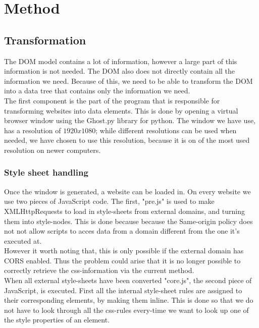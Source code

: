 \chapter{Method}\label{method}

\section{Transformation}
The DOM model contains a lot of information, however a large part of this information is not needed. The DOM also does not directly contain all the information we need. Because of this, we need to be able to transform the DOM into a data tree that contains only the information we need.
\\The first component is the part of the program that is responsible for transforming websites into data elements. This is done by opening a virtual browser window using the Ghost.py library for python. The window we have use, has a resolution of $1920x1080$; while different resolutions can be used when needed, we have chosen to use this resolution, because it is on of the most used resolution on newer computers.
\subsection{Style sheet handling}
Once the window is generated, a website can be loaded in. On every website we use two pieces of JavaScript code. The first, "pre.js" is used to make XMLHttpRequests to load in style-sheets from external domains, and turning them into style-nodes. This is done because because the Same-origin policy does not not allow scripts to acces data from a domain different from the one it's executed at.
\\However it worth noting that, this is only possible if the external domain has CORS enabled. Thus the problem could arise that it is no longer possible to correctly retrieve the css-information via the current method.
\\When all external style-sheets have been converted "core.js", the second piece of JavaScript, is executed. First all the internal style-sheet rules are assigned to their corresponding elements, by making them inline. This is done so that we do not have to look through all the css-rules every-time we want to look up one of the style properties of an element.

